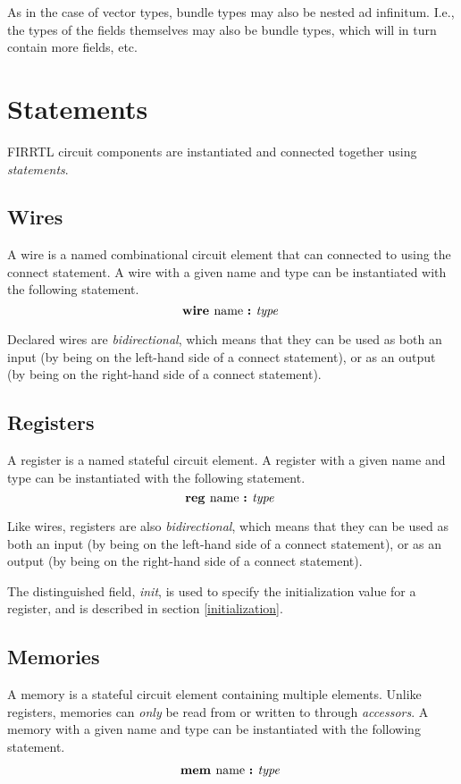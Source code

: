 \documentclass[12pt]{article}
\begin{document}
As in the case of vector types, bundle types may also be nested ad infinitum. I.e., the types of the fields themselves may also be bundle types, which will in turn contain more fields, etc. 

\section{Statements}

FIRRTL circuit components are instantiated and connected together using {\em statements}.

\subsection{Wires}
A wire is a named combinational circuit element that can connected to using the connect statement. A wire with a given name and type can be instantiated with the following statement.
\[
\text{\bf wire\ } \text{name } \text{\bf :\ } \text{\em type\ } \\
\]

Declared wires are {\em bidirectional}, which means that they can be used as both an input (by being on the left-hand side of a connect statement), or as an output (by being on the right-hand side of a connect statement).

\subsection{Registers}
A register is a named stateful circuit element. A register with a given name and type can be instantiated with the following statement.
\[
\text{\bf reg\ } \text{name } \text{\bf :\ } \text{\em type\ } \\
\]

Like wires, registers are also {\em bidirectional}, which means that they can be used as both an input (by being on the left-hand side of a connect statement), or as an output (by being on the right-hand side of a connect statement). 

The distinguished field, {\em init}, is used to specify the initialization value for a register, and is described in section \ref{initialization}. 

\subsection{Memories}
A memory is a stateful circuit element containing multiple elements. Unlike registers, memories can {\em only} be read from or written to through {\em accessors}. A memory with a given name and type can be instantiated with the following statement.
\[
\begin{aligned}
\text{\bf mem\ } \text{name } \text{\bf :\ } \text{\em type\ } \\
\end{aligned}
\]
\end{document}
